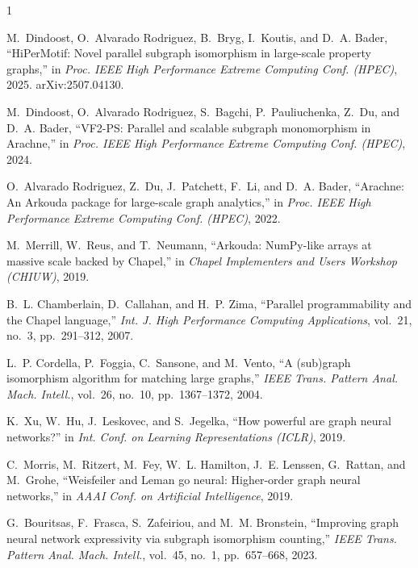 \documentclass[conference]{IEEEtran}
\begin{document}
\begin{thebibliography}{1}

M.~Dindoost, O.~Alvarado Rodriguez, B.~Bryg, I.~Koutis, and D.~A. Bader,
``HiPerMotif: Novel parallel subgraph isomorphism in large-scale property graphs,''
in \emph{Proc. IEEE High Performance Extreme Computing Conf. (HPEC)}, 2025.
arXiv:2507.04130.

M.~Dindoost, O.~Alvarado Rodriguez, S.~Bagchi, P.~Pauliuchenka, Z.~Du, and
D.~A. Bader,
``VF2-PS: Parallel and scalable subgraph monomorphism in Arachne,''
in \emph{Proc. IEEE High Performance Extreme Computing Conf. (HPEC)}, 2024.

O.~Alvarado Rodriguez, Z.~Du, J.~Patchett, F.~Li, and D.~A. Bader,
``Arachne: An Arkouda package for large-scale graph analytics,''
in \emph{Proc. IEEE High Performance Extreme Computing Conf. (HPEC)}, 2022.

M.~Merrill, W.~Reus, and T.~Neumann,
``Arkouda: NumPy-like arrays at massive scale backed by Chapel,''
in \emph{Chapel Implementers and Users Workshop (CHIUW)}, 2019.

B.~L. Chamberlain, D.~Callahan, and H.~P. Zima,
``Parallel programmability and the Chapel language,''
\emph{Int. J. High Performance Computing Applications}, vol.~21, no.~3,
pp.~291--312, 2007.

L.~P. Cordella, P.~Foggia, C.~Sansone, and M.~Vento,
``A (sub)graph isomorphism algorithm for matching large graphs,''
\emph{IEEE Trans. Pattern Anal. Mach. Intell.}, vol.~26, no.~10,
pp.~1367--1372, 2004.

K.~Xu, W.~Hu, J.~Leskovec, and S.~Jegelka,
``How powerful are graph neural networks?''
in \emph{Int. Conf. on Learning Representations (ICLR)}, 2019.

C.~Morris, M.~Ritzert, M.~Fey, W.~L. Hamilton, J.~E. Lenssen, G.~Rattan, and
M.~Grohe,
``Weisfeiler and Leman go neural: Higher-order graph neural networks,''
in \emph{AAAI Conf. on Artificial Intelligence}, 2019.

G.~Bouritsas, F.~Frasca, S.~Zafeiriou, and M.~M. Bronstein,
``Improving graph neural network expressivity via subgraph isomorphism counting,''
\emph{IEEE Trans. Pattern Anal. Mach. Intell.}, vol.~45, no.~1, pp.~657--668, 2023.


\end{thebibliography}
\end{document}
